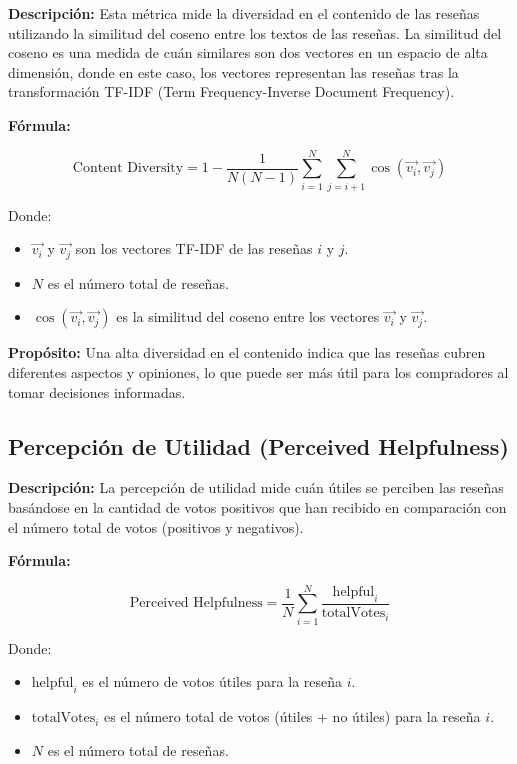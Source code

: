 \documentclass{llncs}
\begin{document}
    \textbf{Descripción:}  
    Esta métrica mide la diversidad en el contenido de las reseñas utilizando la similitud del coseno entre los textos de las reseñas. La similitud del coseno es una medida de cuán similares son dos vectores en un espacio de alta dimensión, donde en este caso, los vectores representan las reseñas tras la transformación TF-IDF (Term Frequency-Inverse Document Frequency).

    \textbf{Fórmula:}

    \[
    \text{Content Diversity} = 1 - \frac{1}{N(N-1)} \sum_{i=1}^{N}\sum_{j=i+1}^{N} \cos(\vec{v_i}, \vec{v_j})
    \]

    Donde:
    \begin{itemize}
        \item \( \vec{v_i} \) y \( \vec{v_j} \) son los vectores TF-IDF de las reseñas \( i \) y \( j \).
        \item \( N \) es el número total de reseñas.
        \item \( \cos(\vec{v_i}, \vec{v_j}) \) es la similitud del coseno entre los vectores \( \vec{v_i} \) y \( \vec{v_j} \).
    \end{itemize}

    \textbf{Propósito:}  
    Una alta diversidad en el contenido indica que las reseñas cubren diferentes aspectos y opiniones, lo que puede ser más útil para los compradores al tomar decisiones informadas.

    \subsection{Percepción de Utilidad (Perceived Helpfulness)}

    \textbf{Descripción:}  
    La percepción de utilidad mide cuán útiles se perciben las reseñas basándose en la cantidad de votos positivos que han recibido en comparación con el número total de votos (positivos y negativos).

    \textbf{Fórmula:}

    \[
    \text{Perceived Helpfulness} = \frac{1}{N} \sum_{i=1}^{N} \frac{\text{helpful}_{i}}{\text{totalVotes}_{i}}
    \]

    Donde:
    \begin{itemize}
        \item \( \text{helpful}_{i} \) es el número de votos útiles para la reseña \( i \).
        \item \( \text{totalVotes}_{i} \) es el número total de votos (útiles + no útiles) para la reseña \( i \).
        \item \( N \) es el número total de reseñas.
    \end{itemize}
\end{document}
